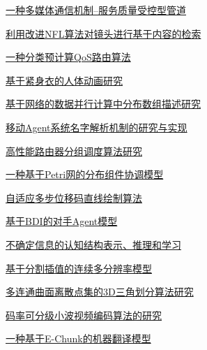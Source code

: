 \documentclass[a4paper]{article}
\begin{document}
\href{http://www.jos.org.cn/ch/reader/download_pdf.aspx?file_no=20020415&year_id=2002&quarter_id=4&falg=1}{一种多媒体通信机制--服务质量受控型管道}

\href{http://www.jos.org.cn/ch/reader/download_pdf.aspx?file_no=20020416&year_id=2002&quarter_id=4&falg=1}{利用改进NFL算法对镜头进行基于内容的检索}

\href{http://www.jos.org.cn/ch/reader/download_pdf.aspx?file_no=20020417&year_id=2002&quarter_id=4&falg=1}{一种分类预计算QoS路由算法}

\href{http://www.jos.org.cn/ch/reader/download_pdf.aspx?file_no=20020418&year_id=2002&quarter_id=4&falg=1}{基于紧身衣的人体动画研究}

\href{http://www.jos.org.cn/ch/reader/download_pdf.aspx?file_no=20020419&year_id=2002&quarter_id=4&falg=1}{基于网络的数据并行计算中分布数组描述研究}

\href{http://www.jos.org.cn/ch/reader/download_pdf.aspx?file_no=20020420&year_id=2002&quarter_id=4&falg=1}{移动Agent系统名字解析机制的研究与实现}

\href{http://www.jos.org.cn/ch/reader/download_pdf.aspx?file_no=20020421&year_id=2002&quarter_id=4&falg=1}{高性能路由器分组调度算法研究}

\href{http://www.jos.org.cn/ch/reader/download_pdf.aspx?file_no=20020422&year_id=2002&quarter_id=4&falg=1}{一种基于Petri网的分布组件协调模型}

\href{http://www.jos.org.cn/ch/reader/download_pdf.aspx?file_no=20020423&year_id=2002&quarter_id=4&falg=1}{自适应多步位移码直线绘制算法}

\href{http://www.jos.org.cn/ch/reader/download_pdf.aspx?file_no=20020424&year_id=2002&quarter_id=4&falg=1}{基于BDI的对手Agent模型}

\href{http://www.jos.org.cn/ch/reader/download_pdf.aspx?file_no=20020425&year_id=2002&quarter_id=4&falg=1}{不确定信息的认知结构表示、推理和学习}

\href{http://www.jos.org.cn/ch/reader/download_pdf.aspx?file_no=20020426&year_id=2002&quarter_id=4&falg=1}{基于分割插值的连续多分辨率模型}

\href{http://www.jos.org.cn/ch/reader/download_pdf.aspx?file_no=20020427&year_id=2002&quarter_id=4&falg=1}{多连通曲面离散点集的3D三角划分算法研究}

\href{http://www.jos.org.cn/ch/reader/download_pdf.aspx?file_no=20020428&year_id=2002&quarter_id=4&falg=1}{码率可分级小波视频编码算法的研究}

\href{http://www.jos.org.cn/ch/reader/download_pdf.aspx?file_no=20020429&year_id=2002&quarter_id=4&falg=1}{一种基于E-Chunk的机器翻译模型}
\end{document}
